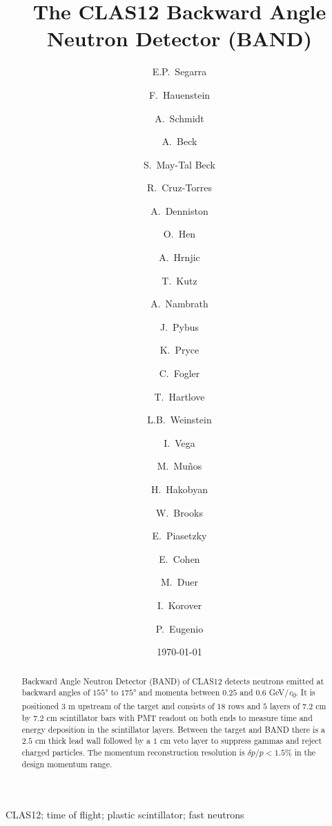 \documentclass[3p,final,twocolumn]{elsarticle}
\newcommand*{\MIT }{Massachusetts Institute of Technology, Cambridge, Massachusetts 02139, USA}
\newcommand*{\ODU}{Old Dominion University, Norfolk, Virginia 23529, USA}
\newcommand*{\TAU }{School of Physics and Astronomy, Tel Aviv University, Tel Aviv 69978, Israel}
\newcommand*{\NRC}{Nuclear Research Center Negev, Be'er Sheva 84190, Israel}
\newcommand*{\FSU}{Florida State University, Tallahassee, Florida 32306, USA}
\newcommand*{\UTFSM}{Universidad T\'{e}cnica Federico Santa Mar\'{i}a, Casilla 110-V Valpara\'{i}so, Chile}
\begin{document}
\begin{frontmatter}

\title{The CLAS12 Backward Angle Neutron Detector (BAND) }



\author{E.P.~Segarra}
\author{F.~Hauenstein}

\author{A.~Schmidt}
\author{A.~Beck}
\author{S.~May-Tal Beck}
\author{R.~Cruz-Torres}
\author{A.~Denniston}
\author{O.~Hen}
\author{A.~Hrnjic}
\author{T.~Kutz}
\author{A.~Nambrath}
\author{J.~Pybus }
\address{\MIT}

\author{K.~Pryce}
\author{C.~Fogler}
\author{T.~Hartlove}
\author{L.B.~Weinstein}
\address{\ODU}
\author{I.~Vega}
\author{M.~Mu\~nos}
\author{H.~Hakobyan}
\author{W.~Brooks}
\address{\UTFSM}
\author{E.~Piasetzky}
\author{E.~Cohen}
\author{M.~Duer}
\address{\TAU}
\author{I.~Korover}
\address{\NRC}
\author{P.~Eugenio}
\address{\FSU}

\date{\today}
\begin{abstract}
  Backward Angle Neutron Detector (BAND) of CLAS12 detects neutrons
  emitted at backward angles of $155$\si{\degree} to $175$\si{\degree}
  and momenta between $0.25$ and $0.6$ \si{\GeV/\clight}. It is
  positioned $3$ \si{\meter} upstream of the target and consists of
  $18$ rows and $5$ layers of $7.2$ \si{\centi\meter} by $7.2$
  \si{\centi\meter} scintillator bars with PMT readout on both ends to
  measure time and energy deposition in the scintillator
  layers. Between the target and BAND there is a $2.5$
  \si{\centi\meter} thick lead wall followed by a $1$
  \si{\centi\meter} veto layer to suppress gammas and reject charged
  particles. The momentum reconstruction
  resolution is $\delta p/p < 1.5$\% in the design momentum range.
\end{abstract}

\begin{keyword}
CLAS12; time of flight; plastic scintillator; fast neutrons
\end{keyword}
\end{frontmatter}
\end{document}
